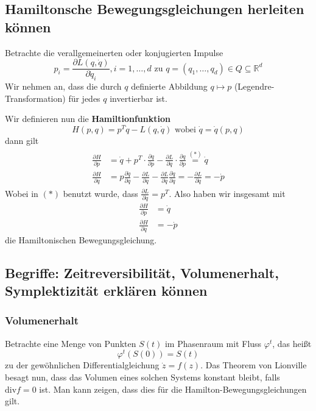\documentclass[]{article}
\begin{document}
\subsection*{Hamiltonsche Bewegungsgleichungen herleiten können}
Betrachte die verallgemeinerten oder konjugierten Impulse
\begin{equation*}
p_i = \frac{\partial L (q, \dot{q})}{\partial \dot{q}_i}, i=1, \dotsc, d \text{ zu } q = (q_1, \dotsc, q_d) \in Q \subseteq \mathbb{R}^d
\end{equation*}
Wir nehmen an, dass die durch $q$ definierte Abbildung $q \mapsto p$ (Legendre-Transformation) für jedes $q$ invertierbar ist.

Wir definieren nun die \textbf{Hamiltionfunktion}
\begin{equation}
H(p,q) = p^T \dot{q} - L(q, \dot{q}) \text{ wobei } \dot{q} = \dot{q}(p,q)
\label{Hamiltonoperator}
\end{equation}
dann gilt
\begin{align}
\begin{split}
\frac{\partial H}{\partial p} &= \dot{q} + p^T \cdot \frac{\partial q}{\partial p} - \frac{\partial L}{\partial \dot{q}} \cdot \frac{\partial q}{ \partial p} \stackrel{(*)}{=} \dot{q} \\
\frac{\partial H}{\partial q} &= p \frac{\partial \dot{q}}{\partial q} - \frac{\partial L}{\partial q} - \frac{\partial L}{\partial \dot{q}} \frac{\partial \dot{q}}{\partial q} = - \frac{\partial L}{\partial \dot{q}} = - \dot{p}
\end{split}
\end{align}
Wobei in $(*)$ benutzt wurde, dass $\frac{\partial L}{\partial \dot{q}} = p^T$. Also haben wir insgesamt mit
\begin{align*}
\frac{\partial H}{\partial p} &= \dot{q} \\
\frac{\partial H}{\partial q} &= - \dot{p}
\end{align*} 
die Hamiltonischen Bewegungsgleichung.

\subsection*{Begriffe: Zeitreversibilität, Volumenerhalt, Symplektizität erklären können}

\subsubsection*{Volumenerhalt}
Betrachte eine Menge von Punkten $S(t)$ im Phasenraum mit Fluss $\varphi^t$, das heißt
\begin{equation*}
\varphi^t(S(0)) = S(t)
\end{equation*}
zu der gewöhnlichen Differentialgleichung $\dot{z} = f(z)$. 
Das Theorem von Lionville besagt nun, dass das Volumen eines solchen Systems konstant bleibt, falls $ \mathrm{div} f = 0 $ ist. Man kann zeigen, dass dies für die Hamilton-Bewegungsgleichungen gilt.
\end{document}
